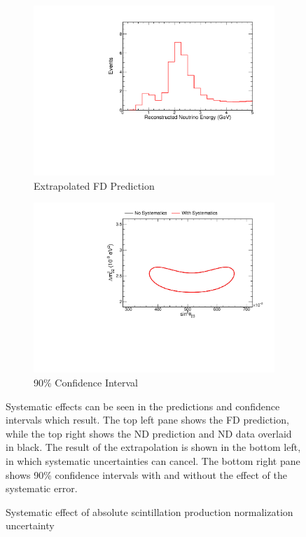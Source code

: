 {\begin{figure}
\begin{center}
\begin{subfigure}[c]{0.49\textwidth}
\includegraphics[width=\textwidth]{figures/systs/prediction/fd_extrap_prediction_birksNormAbs.pdf}
\caption*{Extrapolated FD Prediction}
\end{subfigure}
\begin{subfigure}[c]{0.49\textwidth}
\includegraphics[width=\textwidth]{figures/systs/prediction/fd_extrap_contour_birksNormAbs.pdf}
\caption*{90\% Confidence Interval}
\end{subfigure}
\end{center}
\caption{Systematic effect of absolute scintillation production normalization uncertainty}{
Systematic effects can be seen in the predictions and confidence intervals
which result.
The top left pane shows the FD prediction, while the top right shows the
ND prediction and ND data overlaid in black.
The result of the extrapolation is shown in the bottom left, in which
systematic uncertainties can cancel.
The bottom right pane shows 90\% confidence intervals with and without
the effect of the systematic error.}
\label{syst_fig_birksNormAbs}


\end{figure}}
